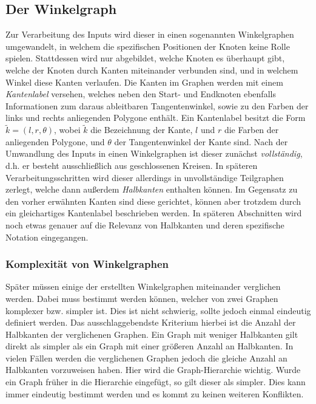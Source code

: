 \subsection{Der Winkelgraph}
Zur Verarbeitung des Inputs wird dieser in einen sogenannten Winkelgraphen umgewandelt, in welchem die spezifischen Positionen der Knoten
keine Rolle spielen. Stattdessen wird nur abgebildet, welche Knoten es überhaupt gibt, welche der Knoten durch Kanten miteinander verbunden
sind, und in welchem Winkel diese Kanten verlaufen.
Die Kanten im Graphen werden mit einem \textit{Kantenlabel} versehen, welches neben den Start- und Endknoten ebenfalls Informationen zum
daraus ableitbaren Tangentenwinkel, sowie zu den Farben der links und rechts anliegenden Polygone enthält. Ein Kantenlabel besitzt die Form
\(\tilde{k} = (l,r,\theta)\), wobei \(\tilde{k}\) die Bezeichnung der Kante, \(l\) und \(r\) die Farben der anliegenden Polygone, und
\(\theta\) der Tangentenwinkel der Kante sind.
Nach der Umwandlung des Inputs in einen Winkelgraphen ist dieser zunächst \textit{vollständig}, d.h. er besteht ausschließlich aus
geschlossenen Kreisen. In späteren Verarbeitungsschritten wird dieser allerdings in unvollständige Teilgraphen zerlegt, welche dann außerdem
\textit{Halbkanten} enthalten können. Im Gegensatz zu den vorher erwähnten Kanten sind diese gerichtet, können aber trotzdem durch ein
gleichartiges Kantenlabel beschrieben werden. In späteren Abschnitten wird noch etwas genauer auf die Relevanz von Halbkanten und deren
spezifische Notation eingegangen.

\subsubsection{Komplexität von Winkelgraphen}
Später müssen einige der erstellten Winkelgraphen miteinander verglichen werden. Dabei muss bestimmt werden können, welcher
von zwei Graphen komplexer bzw. simpler ist. Dies ist nicht schwierig, sollte jedoch einmal eindeutig definiert werden. Das ausschlaggebendste
Kriterium hierbei ist die Anzahl der Halbkanten der verglichenen Graphen. Ein Graph mit weniger
Halbkanten gilt direkt als simpler als ein Graph mit einer größeren Anzahl an Halbkanten. In vielen Fällen werden die verglichenen Graphen jedoch die gleiche Anzahl
an Halbkanten vorzuweisen haben. Hier wird die Graph-Hierarchie wichtig. Wurde ein Graph früher in die Hierarchie eingefügt, so gilt dieser als
simpler. Dies kann immer eindeutig bestimmt werden und es kommt zu keinen weiteren Konflikten.

